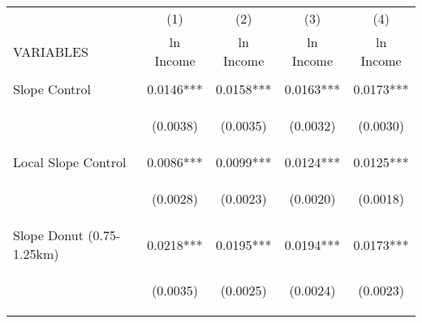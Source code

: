 
\begin{tabular}{lcccc} \hline
 & (1) & (2) & (3) & (4) \\
VARIABLES & ln Income & ln Income & ln Income & ln Income \\ \hline
\vspace{4pt} & \begin{footnotesize}\end{footnotesize} & \begin{footnotesize}\end{footnotesize} & \begin{footnotesize}\end{footnotesize} & \begin{footnotesize}\end{footnotesize} \\
Slope Control & 0.0146*** & 0.0158*** & 0.0163*** & 0.0173*** \\
\vspace{4pt} & \begin{footnotesize}(0.0038)\end{footnotesize} & \begin{footnotesize}(0.0035)\end{footnotesize} & \begin{footnotesize}(0.0032)\end{footnotesize} & \begin{footnotesize}(0.0030)\end{footnotesize} \\
Local Slope Control & 0.0086*** & 0.0099*** & 0.0124*** & 0.0125*** \\
\vspace{4pt} & \begin{footnotesize}(0.0028)\end{footnotesize} & \begin{footnotesize}(0.0023)\end{footnotesize} & \begin{footnotesize}(0.0020)\end{footnotesize} & \begin{footnotesize}(0.0018)\end{footnotesize} \\
Slope Donut (0.75-1.25km) & 0.0218*** & 0.0195*** & 0.0194*** & 0.0173*** \\
\vspace{4pt} & \begin{footnotesize}(0.0035)\end{footnotesize} & \begin{footnotesize}(0.0025)\end{footnotesize} & \begin{footnotesize}(0.0024)\end{footnotesize} & \begin{footnotesize}(0.0023)\end{footnotesize} \\

\end{tabular}

